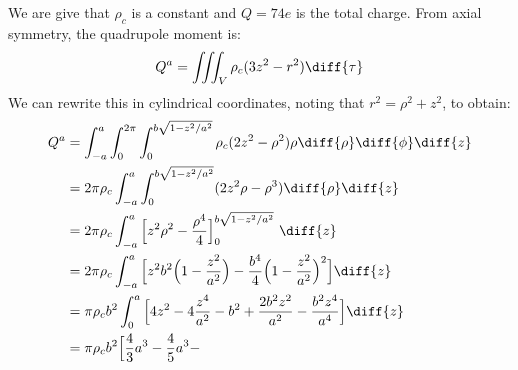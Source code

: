 \documentclass[crop=false,class=book,oneside]{standalone}
\begin{document}
            \begin{solution}
                We are give that $\rho_{c}$ is a constant and
                $Q=74e$ is the total charge. From axial symmetry, the
                quadrupole moment is:
                \begin{equation}
                    Q^{a}=\iiint_{V}\rho_{c}(3z^{2}-r^{2})\diff{\tau}
                \end{equation}
                We can rewrite this in cylindrical coordinates,
                noting that $r^{2}=\rho^{2}+z^{2}$, to obtain:
                \begin{subequations}
                    \begin{align}
                        Q^{a}&=\int_{-a}^{a}\int_{0}^{2\pi}
                            \int_{0}^{b\sqrt{1-z^{2}/a^{2}}}
                                \rho_{c}(2z^{2}-\rho^{2})\rho
                                \diff{\rho}\diff{\phi}\diff{z}\\
                            &=2\pi\rho_{c}\int_{-a}^{a}
                                \int_{0}^{b\sqrt{1-z^{2}/a^{2}}}
                                (2z^{2}\rho-\rho^{3})
                                \diff{\rho}\diff{z}\\
                            &=2\pi\rho_{c}\int_{-a}^{a}
                                \Big[z^{2}\rho^{2}-
                                     \frac{\rho^{4}}{4}
                                \Big]_{0}^{b\sqrt{1-z^{2}/a^{2}}}\
                                \diff{z}\\
                            &=2\pi\rho_{c}\int_{-a}^{a}
                                \Big[z^{2}b^{2}
                                    \Big(1-\frac{z^{2}}{a^{2}}\Big)
                                    -\frac{b^{4}}{4}
                                    \Big(
                                        1-\frac{z^{2}}{a^{2}}
                                    \Big)^{2}
                                \Big]\diff{z}\\
                            &=\pi\rho_{c}b^{2}\int_{0}^{a}
                                \Big[4z^{2}-
                                     4\frac{z^{4}}{a^{2}}-
                                     b^{2}+
                                     \frac{2b^{2}z^{2}}{a^{2}}-
                                     \frac{b^{2}z^{4}}{a^{4}}
                                \Big]\diff{z}\\
                            &=\pi\rho_{c}b^{2}
                                \Big[\frac{4}{3}a^{3}-
                                     \frac{4}{5}a^{3}-

\end{align}
\end{subequations}
\end{solution}
\end{document}
